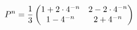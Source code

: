 \documentclass[preview]{standalone}
\begin{document}
\begin{align*}
\special{dvisvgm:raw <g id='unique000'>}P^n=\frac13\begin{pmatrix}1+2\cdot4^{-n}&2-2\cdot4^{-n}\\1-4^{-n}&2+4^{-n}\end{pmatrix}\special{dvisvgm:raw </g>}
\end{align*}
\end{document}
